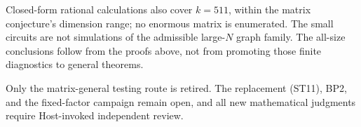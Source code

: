 \documentclass[11pt]{article}
\begin{document}
Closed-form rational calculations also cover $k=511$, within the
matrix conjecture's dimension range; no enormous matrix is enumerated.
The small circuits are not simulations of the admissible large-$N$
graph family. The all-size conclusions follow from the proofs above,
not from promoting those finite diagnostics to general theorems.

Only the matrix-general testing route is retired.
The replacement (ST11), BP2, and the fixed-factor campaign remain open,
and all new mathematical judgments require Host-invoked independent review.
\end{document}
